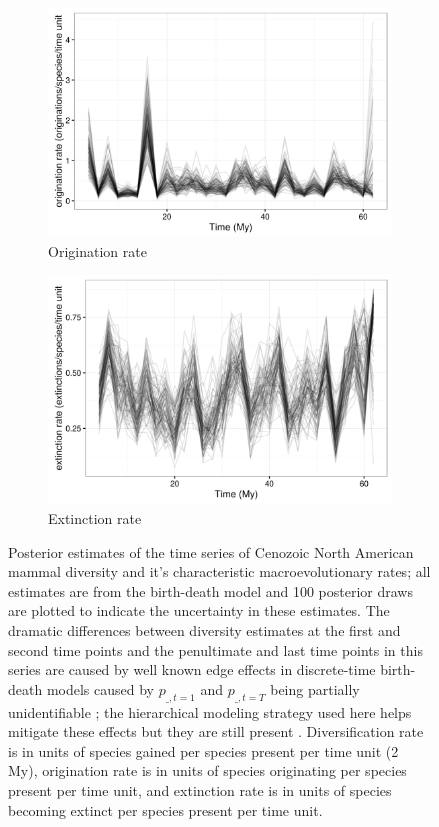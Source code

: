 \documentclass[12pt,letterpaper]{article}
\begin{document}
\begin{figure}[ht]
  \begin{subfigure}[b]{0.45\textwidth}
    \includegraphics[width=\textwidth,height=0.5\textheight,keepaspectratio=true]{figure/orig_rate}
    \caption{Origination rate}
    \label{fig:origin_rate}
  \end{subfigure}
  \begin{subfigure}[b]{0.45\textwidth}
    \includegraphics[width=\textwidth,height=0.5\textheight,keepaspectratio=true]{figure/death_rate}
    \caption{Extinction rate}
    \label{fig:extinct_rate}
  \end{subfigure}
  \caption[Estimated mammal log-diversity and macroevolutionary rates for the Cenozoic]{Posterior estimates of the time series of Cenozoic North American mammal diversity and it's characteristic macroevolutionary rates; all estimates are from the birth-death model and 100 posterior draws are plotted to indicate the uncertainty in these estimates. The dramatic differences between diversity estimates at the first and second time points and the penultimate and last time points in this series are caused by well known edge effects in discrete-time birth-death models caused by \(p_{\_, t = 1}\) and \(p_{\_, t = T}\) being partially unidentifiable \citep{Royle2008}; the hierarchical modeling strategy used here helps mitigate these effects but they are still present \citep{Gelman2013d,Royle2008}. Diversification rate is in units of species gained per species present per time unit (2 My), origination rate is in units of species originating per species present per time unit, and extinction rate is in units of species becoming extinct per species present per time unit.}

\end{figure}
\end{document}
